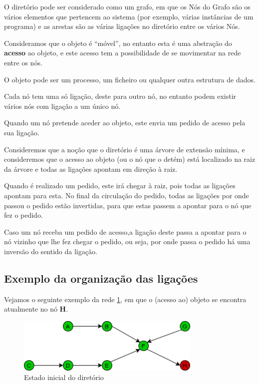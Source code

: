 O diretório pode ser considerado como um grafo, em que os Nós do Grafo são os vários elementos que pertencem ao sistema (por exemplo, várias instâncias de um programa) e as arestas são as várias ligações no diretório entre os vários Nós.


Consideramos que o objeto é ``móvel'', no entanto esta é uma abstração do \textbf{acesso} ao objeto, e este acesso tem a possibilidade de se movimentar na rede entre os nós.

O objeto pode ser um processo, um ficheiro ou qualquer outra estrutura de dados.

Cada nó tem uma só ligação, deste para outro nó, no entanto podem existir vários nós com ligação a um único nó.

Quando um nó pretende aceder ao objeto, este envia um pedido de acesso pela sua ligação. 



Consideremos que a noção que o diretório é uma árvore de extensão mínima, e consideremos que o acesso ao objeto (ou o nó que o detém) está localizado na raiz da árvore e todas as ligações apontam em direção à raiz.

Quando é realizado um pedido, este irá chegar à raiz, pois todas as ligações apontam para esta. No final da circulação do pedido, todas as ligações por onde passou o pedido estão invertidas, para que estas passem a apontar para o nó que fez o pedido.

Caso um nó receba um pedido de acesso,a ligação deste passa a apontar para o nó vizinho que lhe fez chegar o pedido, ou seja, por onde passa o pedido há uma inversão do sentido da ligação.



\subsection*{Exemplo da organização das ligações}

Vejamos o seguinte exemplo da rede \ref{motivacao:img:estado_inicial}, em que o (acesso ao) objeto se encontra atualmente no nó \textbf{H}.


\begin{figure}[!htb]
\centering
\includegraphics[width=250pt]{um_pedido_1.png}
\caption{Estado inicial do diretório}
\label{motivacao:img:estado_inicial}
\end{figure}

